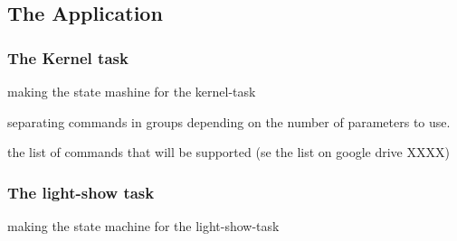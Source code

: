 \subsection{The Application}
\label{sec:TheApplication}

\subsubsection{The Kernel task}
making the state mashine for the kernel-task

separating commands in groups depending on the number of parameters to use. 

the list of commands that will be supported (se the list on google drive XXXX)

\subsubsection{The light-show task}
making the state machine for the light-show-task






